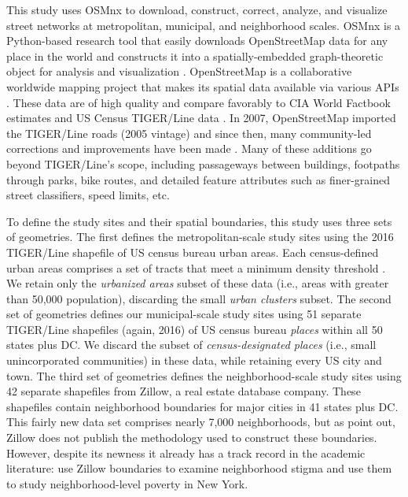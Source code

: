 \documentclass{article}
\begin{document}
This study uses OSMnx to download, construct, correct, analyze, and visualize street networks at metropolitan, municipal, and neighborhood scales. OSMnx is a Python-based research tool that easily downloads OpenStreetMap data for any place in the world and constructs it into a spatially-embedded graph-theoretic object for analysis and visualization \cite{boeing_osmnx:_2017}. OpenStreetMap is a collaborative worldwide mapping project that makes its spatial data available via various APIs \cite{corcoran_analysing_2013, jokar_arsanjani_openstreetmap_2015}. These data are of high quality and compare favorably to CIA World Factbook estimates and US Census TIGER/Line data \cite{haklay_how_2010, over_generating_2010, zielstra_comparative_2011, maron_how_2015, wu_improving_2005, frizzelle_importance_2009}. In 2007, OpenStreetMap imported the TIGER/Line roads (2005 vintage) and since then, many community-led corrections and improvements have been made \cite{willis_openstreetmap_2008}. Many of these additions go beyond TIGER/Line's scope, including passageways between buildings, footpaths through parks, bike routes, and detailed feature attributes such as finer-grained street classifiers, speed limits, etc.

To define the study sites and their spatial boundaries, this study uses three sets of geometries. The first defines the metropolitan-scale study sites using the 2016 TIGER/Line shapefile of US census bureau urban areas. Each census-defined urban areas comprises a set of tracts that meet a minimum density threshold \cite{u.s._census_bureau_2010_2010}. We retain only the \emph{urbanized areas} subset of these data (i.e., areas with greater than 50,000 population), discarding the small \emph{urban clusters} subset. The second set of geometries defines our municipal-scale study sites using 51 separate TIGER/Line shapefiles (again, 2016) of US census bureau \emph{places} within all 50 states plus DC. We discard the subset of \emph{census-designated places} (i.e., small unincorporated communities) in these data, while retaining every US city and town. The third set of geometries defines the neighborhood-scale study sites using 42 separate shapefiles from Zillow, a real estate database company. These shapefiles contain neighborhood boundaries for major cities in 41 states plus DC. This fairly new data set comprises nearly 7,000 neighborhoods, but as \citet{schernthanner_spatial_2016} point out, Zillow does not publish the methodology used to construct these boundaries. However, despite its newness it already has a track record in the academic literature: \citet{besbris_effect_2015} use Zillow boundaries to examine neighborhood stigma and \citet{albrecht_indicator_2014} use them to study neighborhood-level poverty in New York.
\end{document}
